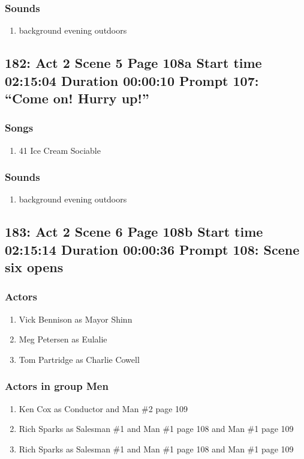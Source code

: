 \subsubsection{Sounds}
\begin{enumerate}
\item background evening outdoors
\end{enumerate}
\subsection{182: Act 2 Scene 5 Page 108a Start time 02:15:04 Duration 00:00:10 Prompt 107: ``Come on! Hurry up!''}
\subsubsection{Songs}
\begin{enumerate}
\item 41 Ice Cream Sociable
\end{enumerate}\subsubsection{Sounds}
\begin{enumerate}
\item background evening outdoors
\end{enumerate}
\subsection{183: Act 2 Scene 6 Page 108b Start time 02:15:14 Duration 00:00:36 Prompt 108: Scene six opens}

\subsubsection{Actors}
\begin{enumerate}
\item Vick Bennison as Mayor Shinn
\item Meg Petersen as Eulalie
\item Tom Partridge as Charlie Cowell
\end{enumerate}
\subsubsection{Actors in group Men}
\begin{enumerate}
\item Ken Cox as Conductor and Man \#2 page 109
\item Rich Sparks as Salesman \#1 and Man \#1 page 108 and Man \#1 page 109
\item Rich Sparks as Salesman \#1 and Man \#1 page 108 and Man \#1 page 109
\end{enumerate}
